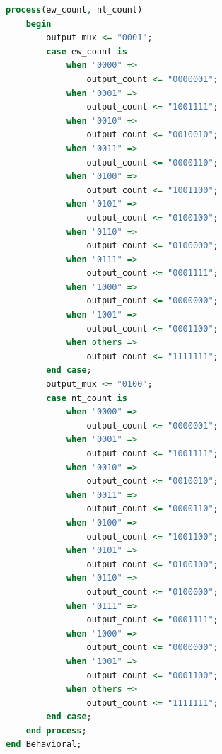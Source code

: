 \documentclass[11pt]{article}
\begin{document}
\begin{appendices}
\begin{lstlisting}[language=VHDL]
    process(ew_count, nt_count)
    begin
        output_mux <= "0001";
        case ew_count is
            when "0000" =>
                output_count <= "0000001";
            when "0001" =>
                output_count <= "1001111";
            when "0010" =>
                output_count <= "0010010";
            when "0011" =>
                output_count <= "0000110";
            when "0100" =>
                output_count <= "1001100";
            when "0101" =>
                output_count <= "0100100";
            when "0110" =>
                output_count <= "0100000";
            when "0111" =>
                output_count <= "0001111";
            when "1000" =>
                output_count <= "0000000";
            when "1001" =>
                output_count <= "0001100";
            when others =>
                output_count <= "1111111";
        end case;
        output_mux <= "0100";
        case nt_count is
            when "0000" =>
                output_count <= "0000001";
            when "0001" =>
                output_count <= "1001111";
            when "0010" =>
                output_count <= "0010010";
            when "0011" =>
                output_count <= "0000110";
            when "0100" =>
                output_count <= "1001100";
            when "0101" =>
                output_count <= "0100100";
            when "0110" =>
                output_count <= "0100000";
            when "0111" =>
                output_count <= "0001111";
            when "1000" =>
                output_count <= "0000000";
            when "1001" =>
                output_count <= "0001100";
            when others =>
                output_count <= "1111111";
        end case;
    end process;
end Behavioral;
\end{lstlisting}


\end{appendices}
\end{document}
